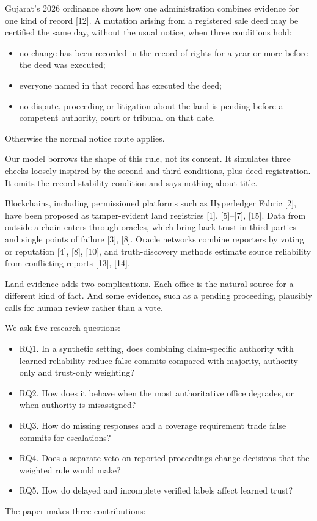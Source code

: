 \documentclass[10pt]{article}
\begin{document}
Gujarat's 2026 ordinance shows how one administration combines evidence for one kind of record [12]. A mutation arising from a registered sale deed may be certified the same day, without the usual notice, when three conditions hold:

\begin{itemize}
\item no change has been recorded in the record of rights for a year or more before the deed was executed;
\item everyone named in that record has executed the deed;
\item no dispute, proceeding or litigation about the land is pending before a competent authority, court or tribunal on that date.
\end{itemize}
Otherwise the normal notice route applies.

Our model borrows the shape of this rule, not its content. It simulates three checks loosely inspired by the second and third conditions, plus deed registration. It omits the record-stability condition and says nothing about title.

Blockchains, including permissioned platforms such as Hyperledger Fabric [2], have been proposed as tamper-evident land registries [1], [5]–[7], [15]. Data from outside a chain enters through oracles, which bring back trust in third parties and single points of failure [3], [8]. Oracle networks combine reporters by voting or reputation [4], [8], [10], and truth-discovery methods estimate source reliability from conflicting reports [13], [14].

Land evidence adds two complications. Each office is the natural source for a different kind of fact. And some evidence, such as a pending proceeding, plausibly calls for human review rather than a vote.

We ask five research questions:

\begin{itemize}
\item RQ1. In a synthetic setting, does combining claim-specific authority with learned reliability reduce false commits compared with majority, authority-only and trust-only weighting?
\item RQ2. How does it behave when the most authoritative office degrades, or when authority is misassigned?
\item RQ3. How do missing responses and a coverage requirement trade false commits for escalations?
\item RQ4. Does a separate veto on reported proceedings change decisions that the weighted rule would make?
\item RQ5. How do delayed and incomplete verified labels affect learned trust?
\end{itemize}
The paper makes three contributions:
\end{document}
